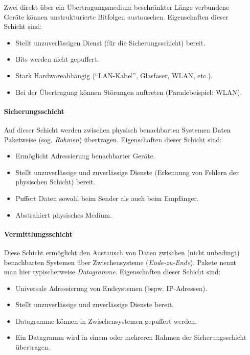 \documentclass[a4paper, 14pt]{article}
\begin{document}
	Zwei direkt über ein Übertragungsmedium beschränkter Länge verbundene Geräte können unstrukturierte Bitfolgen austauschen.
	Eigenschaften dieser Schicht sind:

	\begin{itemize}
		\item Stellt unzuverlässigen Dienst (für die Sicherungsschicht) bereit.
		\item Bits werden nicht gepuffert.
		\item Stark Hardwareabhängig (\enquote{LAN-Kabel}, Glasfaser, WLAN, etc.).
		\item Bei der Übertragung können Störungen auftreten (Paradebeispiel: WLAN).
	\end{itemize}

	\paragraph{Sicherungsschicht}

	Auf dieser Schicht werden zwischen physisch benachbarten Systemen Daten Paketweise (sog. \emph{Rahmen}) übertragen.
	Eigenschaften dieser Schicht sind:

	\begin{itemize}
		\item Ermöglicht Adressierung benachbarter Geräte.
		\item Stellt unzuverlässige und zuverlässige Dienste (Erkennung von Fehlern der physischen Schicht) bereit.
		\item Puffert Daten sowohl beim Sender als auch beim Empfänger.
		\item Abstrahiert physisches Medium.
	\end{itemize}

	\paragraph{Vermittlungsschicht}

	Diese Schicht ermöglicht den Austausch von Daten zwischen (nicht unbedingt) benachbarten Systemen über Zwischensysteme (\emph{Ende-zu-Ende}).
	Pakete nennt man hier typischerweise \emph{Datagramme}.
	Eigenschaften dieser Schicht sind:

	\begin{itemize}
		\item Universale Adressierung von Endsystemen (bspw. IP-Adressen).
		\item Stellt unzuverlässige und zuverlässige Dienste bereit.
		\item Datagramme können in Zwischensystemen gepuffert werden.
		\item Ein Datagramm wird in einem oder mehreren Rahmen der Sicherungsschicht übertragen.
	\end{itemize}
\end{document}
